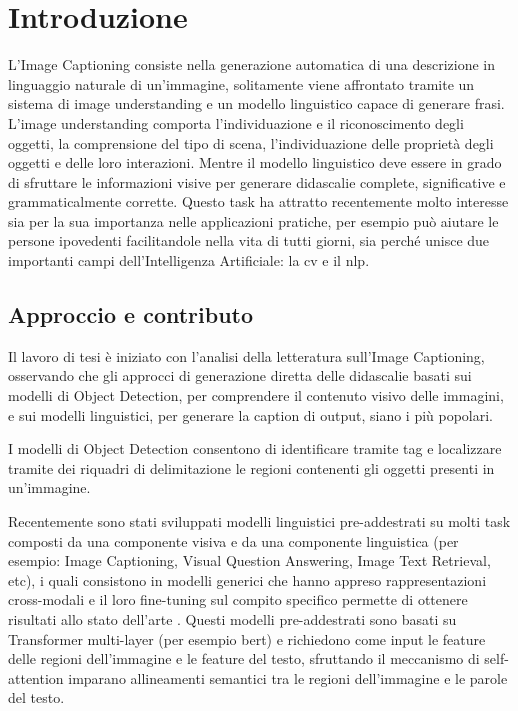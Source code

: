 \chapter{Introduzione}
L'Image Captioning consiste nella generazione automatica di una descrizione in linguaggio naturale di un'immagine, solitamente viene affrontato tramite un sistema di image understanding e un modello linguistico capace di generare frasi.
L'image understanding comporta l'individuazione e il riconoscimento degli oggetti, la comprensione del tipo di scena, l'individuazione delle proprietà degli oggetti e delle loro interazioni.
Mentre il modello linguistico deve essere in grado di sfruttare le informazioni visive per generare didascalie complete, significative e grammaticalmente corrette.
Questo task ha attratto recentemente molto interesse sia per la sua importanza nelle applicazioni pratiche, per esempio può aiutare le persone ipovedenti facilitandole nella vita di tutti giorni, sia perché unisce due importanti campi dell'Intelligenza Artificiale: la \acrlong{cv} e il \acrlong{nlp}.


\section{Approccio e contributo}

Il lavoro di tesi è iniziato con l'analisi della letteratura sull'Image Captioning, osservando che gli approcci di generazione diretta delle didascalie basati sui modelli di Object Detection, per comprendere il contenuto visivo delle immagini, e sui modelli linguistici, per generare la caption di output, siano i più popolari.


I modelli di Object Detection consentono di identificare tramite tag e localizzare tramite dei riquadri di delimitazione le regioni contenenti gli oggetti presenti in un'immagine. 

Recentemente sono stati sviluppati modelli linguistici pre-addestrati su molti task composti da una componente visiva e da una componente linguistica (per esempio: Image Captioning, Visual Question Answering, Image Text Retrieval, etc), i quali consistono in modelli generici che hanno appreso rappresentazioni cross-modali e il loro fine-tuning sul compito specifico permette di ottenere risultati allo stato dell'arte \cite{zhou2020unified, li2019visualbert, li2020unicoder, li2020oscar, zhang2021vinvl}.
Questi modelli pre-addestrati sono basati su Transformer multi-layer (per esempio \acrshort{bert}) e richiedono come input le feature delle regioni dell'immagine e le feature del testo, sfruttando il meccanismo di self-attention imparano allineamenti semantici tra le regioni dell'immagine e le parole del testo.


